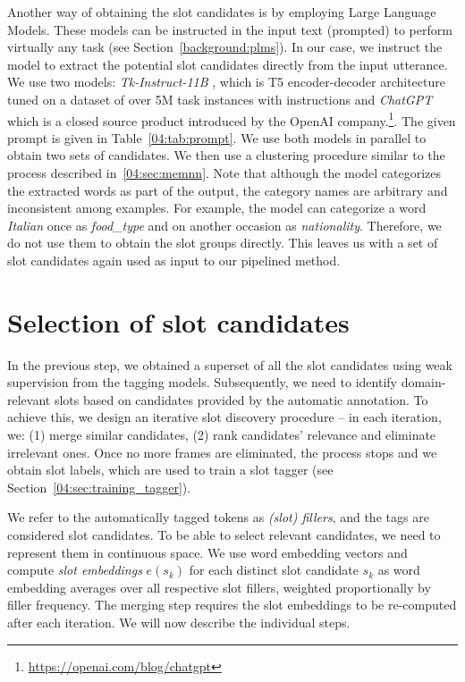Another way of obtaining the slot candidates is by employing Large Language Models.
These models can be instructed in the input text (prompted) to perform virtually any task (see Section~\ref{background:plms}).
In our case, we instruct the model to extract the potential slot candidates directly from the input utterance.
We use two models: \emph{Tk-Instruct-11B} \cite{supernaturalinstructions}, which is T5 encoder-decoder architecture \cite{2020t5} tuned on a dataset of over 5M task instances with instructions and \emph{ChatGPT} which is a closed source product introduced by the OpenAI company.\footnote{\url{https://openai.com/blog/chatgpt}}.
The given prompt is given in Table~\ref{04:tab:prompt}.
We use both models in parallel to obtain two sets of candidates.
We then use a clustering procedure similar to the process described in~\ref{04:sec:memnn}.
Note that although the model categorizes the extracted words as part of the output, the category names are arbitrary and inconsistent among examples.
For example, the model can categorize a word \emph{Italian} once as \textit{food\_type} and on another occasion as \emph{nationality}.
Therefore, we do not use them to obtain the slot groups directly.
This leaves us with a set of slot candidates again used as input to our pipelined method.

\section{Selection of slot candidates}
\label{04:sec:candidate_selection}
In the previous step, we obtained a superset of all the slot candidates using weak supervision from the tagging models.
Subsequently, we need to identify domain-relevant slots based on candidates provided by the automatic annotation.
To achieve this, we design an iterative slot discovery procedure -- in each iteration, we: 
(1) merge similar candidates, 
(2) rank candidates' relevance and eliminate irrelevant ones.
Once no more frames are eliminated, the process stops and we obtain slot labels, which are used to train a slot tagger (see Section~\ref{04:sec:training_tagger}).

We refer to the automatically tagged tokens as \emph{(slot) fillers}, and the tags are considered slot candidates.
To be able to select relevant candidates, we need to represent them in continuous space.
We use word embedding vectors and compute \emph{slot embeddings} $e(s_k)$ for each 
distinct slot candidate $s_k$ as word embedding averages over all respective slot fillers, weighted proportionally by filler frequency.
The merging step requires the slot embeddings to be re-computed after each iteration.
We will now describe the individual steps.

